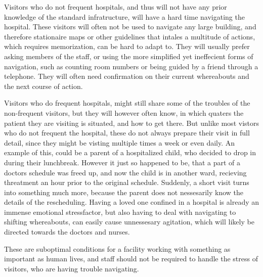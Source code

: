 Visitors who do not frequent hospitals, and thus will not have any prior knowledge of the standard infratructure, will have a hard time navigating the hospital. These visitors will often not be used to navigate any large building, and therefore stationaire maps or other guidelines that intales a multitude of actions, which requires memorization, can be hard to adapt to. They will usually prefer asking members of the staff, or using the more simplified yet ineffecient forms of navigation, such as counting room numbers or being guided by a friend through a telephone. They will often need confirmation on their current whereabouts and the next course of action.

Visitors who do frequent hospitals, might still share some of the troubles of the non-frequent visitors, but they will however often know, in which quaters the patient they are visiting is situated, and how to get there. But unlike most vistors who do not frequent the hospital, these do not always prepare their visit in full detail, since they might be visting multiple times a week or even daily. An example of this, could be a parent of a hospitalized child, who decided to drop in during their lunchbreak. However it just so happened to be, that a part of a doctors schedule was freed up, and now the child is in another ward, recieving threatment an hour prior to the original schedule. Suddenly, a short visit turns into something much more, because the parent does not nessesarily know the details of the rescheduling. Having a loved one confined in a hospital is already an immense emotional stressfactor, but also having to deal with navigating to shifting whereabouts, can easily cause unnessesary agitation, which will likely be directed towards the doctors and nurses.

These are suboptimal conditions for a facility working with something as important as human lives, and staff should not be required to handle the stress of visitors, who are having trouble navigating.



